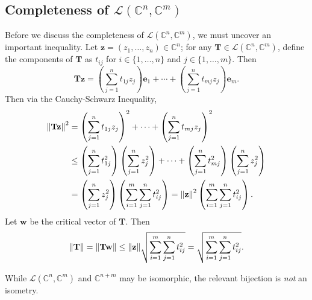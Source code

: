 \documentclass[11pt]{article}
\renewcommand{\vec}[1]{\mathbf{#1}}
\newcommand{\mat}[1]{\mathbf{#1}}
\begin{document}

\subsection{Completeness of \texorpdfstring{$\mathcal{L}(\mathbb{C}^{n}, \mathbb{C}^{m})$}{Matricies}}

Before we discuss the completeness of $\mathcal{L}(\mathbb{C}^{n}, \mathbb{C}^{m})$, we must uncover an important inequality. Let $\vec{z} = (z_{1}, \ldots, z_{n}) \in \mathbb{C}^{n}$; for any $\mat{T} \in \mathcal{L}(\mathbb{C}^{n}, \mathbb{C}^{m})$, define the components of $\mat{T}$ as $t_{ij}$ for $i \in \{ 1, \ldots, n \}$ and $j \in \{ 1, \ldots, m \}$. Then
\[
	\mat{T} \vec{z} = \left( \sum\limits_{j = 1}^{n} t_{1j}z_{j} \right) \vec{e}_{1} + \cdots + \left( \sum\limits_{j = 1}^{n} t_{mj} z_{j} \right) \vec{e}_{m}.
\]
Then via the Cauchy-Schwarz Inequality,
\begin{align*}
	\norm{\mat{T} \vec{z}}^{2} &= \left( \sum_{j = 1}^{n} t_{1j} z_{j} \right)^{2} + \cdots + \left( \sum_{j = 1}^{n} t_{mj} z_{j} \right)^{2} \\
	& \le \left( \sum_{j = 1}^{n} t_{1j}^{2} \right) \left( \sum_{j = 1}^{n} z_{j}^{2} \right) + \cdots + \left( \sum_{j = 1}^{n} t_{mj}^{2} \right) \left( \sum_{j = 1}^{n} z_{j}^{2} \right) \\
	&= \left( \sum_{j = 1}^{n} z_{j}^{2} \right) \left( \sum_{i = 1}^{m} \sum_{j = 1}^{n} t_{ij}^{2} \right) = \norm{\vec{z}}^{2} \left( \sum_{i = 1}^{m} \sum_{j = 1}^{n} t_{ij}^{2} \right).
\end{align*}
Let $\vec{w}$ be the critical vector of $\mat{T}$. Then
\[
	\norm{\mat{T}} = \norm{\mat{T} \vec{w}} \le \norm{\vec{z}} \sqrt{\sum\limits_{i = 1}^{m} \sum\limits_{j = 1}^{n} t_{ij}^{2}} = \sqrt{\sum\limits_{i = 1}^{m} \sum\limits_{j = 1}^{n} t_{ij}^{2}}.
\]

While $\mathcal{L}(\mathbb{C}^{n}, \mathbb{C}^{m})$ and $\mathbb{C}^{n + m}$ may be isomorphic, the relevant bijection is \textit{not} an isometry. 
\end{document}
